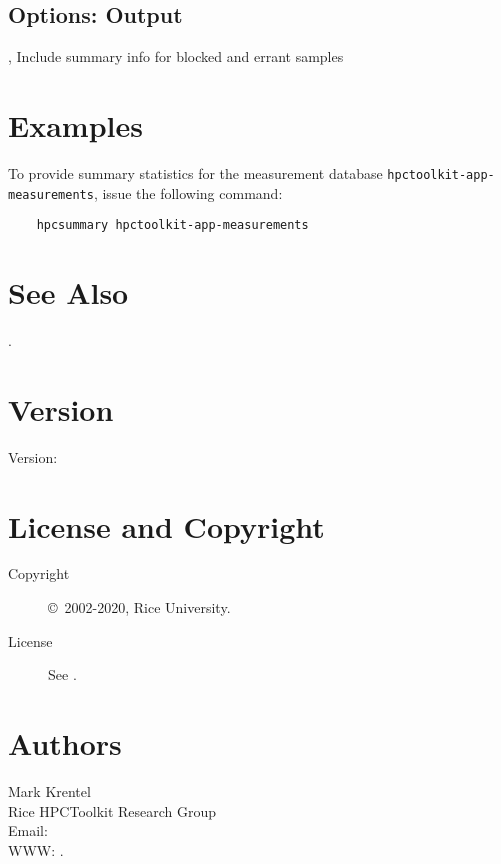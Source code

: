 \documentclass[english]{article}
\begin{document}
\subsection{Options: Output}

\begin{Description}

\item[\Opt{-a}, \Opt{--all}]
Include summary info for blocked and errant samples

\end{Description}


\section{Examples}

To provide summary statistics for the measurement database \texttt{hpctoolkit-app-measurements},
issue the following command:
\begin{verbatim}
    hpcsummary hpctoolkit-app-measurements
\end{verbatim}




\section{See Also}

.

\section{Version}

Version: \Version

\section{License and Copyright}

\begin{description}
\item[Copyright] \copyright\ 2002-2020, Rice University.
\item[License] See .
\end{description}

\section{Authors}

\noindent
Mark Krentel \\
Rice HPCToolkit Research Group \\
Email:  \\
WWW: .

\LatexManEnd
\end{document}
